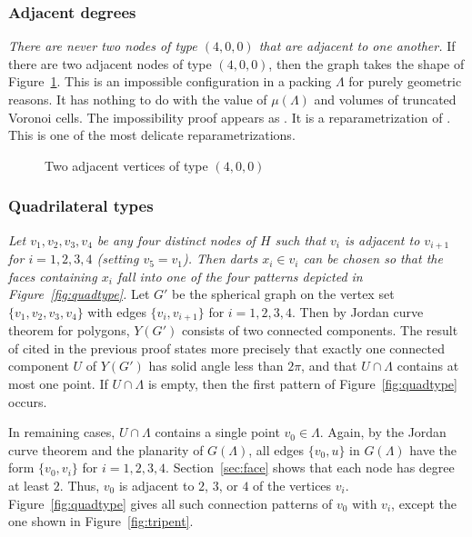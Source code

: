 \documentclass{article} %
\begin{document}
\subsubsection{Adjacent degrees}

{\it There are never two nodes of type $(4,0,0)$ that are adjacent to one another.}
If there are two adjacent nodes of type $(4,0,0)$, then the graph takes the
shape of Figure~\ref{fig:adj4}.  This is an impossible configuration in a packing $\Lambda$
for purely geometric reasons.  It has nothing to do with the value of $\mu(\Lambda)$
and volumes of truncated Voronoi cells.
The impossibility proof appears as \cite[Lemma~3.8]{Hales:2002:Dodec}. It is a reparametrization
of \cite[Prop.4.2]{Hales:1997:DCG}.  This is one of the most delicate reparametrizations.

\begin{figure}[htb]
  \begin{center}
   \end{center}
  \caption{Two adjacent vertices of type $(4,0,0)$}
\label{fig:adj4}
\end{figure}

\subsubsection{Quadrilateral types}

{\it Let $v_1,v_2,v_3,v_4$ be any four distinct nodes of $H$ such that $v_i$ is adjacent
to $v_{i+1}$ for $i=1,2,3,4$ (setting $v_5=v_1$).  Then darts $x_i\in v_i$ can be chosen
so that the faces containing $x_i$ fall into one of the four patterns depicted
in Figure~\ref{fig:quadtype}.}
%
Let $G'$ be the spherical graph on the vertex set $\{v_1,v_2,v_3,v_4\}$
with edges $\{v_i,v_{i+1}\}$ for $i=1,2,3,4$.  Then by
Jordan curve theorem for polygons, $Y(G')$ consists of two connected components.
The result of \cite[Lemma~3.8]{Hales:2002:Dodec} cited in the previous proof states more precisely
that exactly one connected component $U$ of $Y(G')$ has solid angle less than $2\pi$,
and that $U\cap\Lambda$ contains at most one point.
If $U\cap\Lambda$ is empty, then the first pattern of Figure~\ref{fig:quadtype} occurs.

In remaining cases,  $U\cap\Lambda$ contains a single point $v_0\in\Lambda$.  Again, by
the Jordan curve theorem and the planarity of $G(\Lambda)$, 
all edges $\{v_0,u\}$ in $G(\Lambda)$ have the form
$\{v_0,v_i\}$ for $i=1,2,3,4$.  Section~\ref{sec:face} shows that each node has  degree
at least $2$.  Thus,  $v_0$ is adjacent to $2$, $3$, or $4$ of the vertices $v_i$.
Figure~\ref{fig:quadtype} gives all such connection patterns of $v_0$ with $v_i$, except
the one shown in Figure~\ref{fig:tripent}.  
\end{document}
